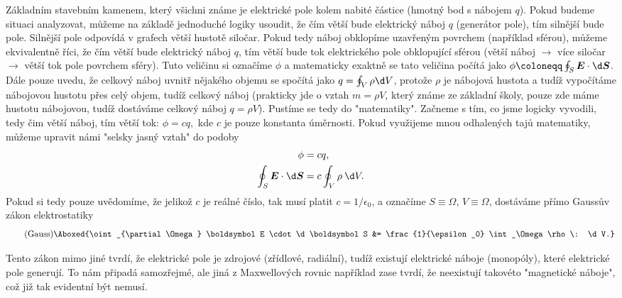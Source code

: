 \documentclass[11pt,a4paper]{report}
\renewcommand{\vec}{\boldsymbol}
\begin{document}
		Základním stavebním kamenem, který všichni známe je elektrické pole kolem nabité částice (hmotný bod s nábojem $q$). Pokud budeme situaci analyzovat, můžeme na základě jednoduché logiky usoudit, že čím větší bude elektrický náboj $q$ (generátor pole), tím silnější bude pole. Silnější pole odpovídá v grafech větší hustotě siločar. Pokud tedy náboj obklopíme uzavřeným povrchem (například sférou), můžeme ekvivalentně říci, že čím větší bude elektrický náboj $q$, tím větší bude tok elektrického pole obklopující sférou (větší náboj $\rightarrow$ více siločar $\rightarrow$ větší tok pole povrchem sféry). Tuto veličinu si označíme $\phi$ a matematicky exaktně se tato veličina počítá jako $\phi \coloneqq \oint_{S} \vec E \cdot \d \vec S$. Dále pouze uvedu, že celkový náboj uvnitř nějakého objemu se spočítá jako $q = \oint_V \rho \d V$, protože $\rho$ je nábojová hustota a tudíž vypočítáme nábojovou hustotu přes celý objem, tudíž celkový náboj (prakticky jde o vztah $m = \rho V$, který známe ze základní školy, pouze zde máme hustotu nábojovou, tudíž dostáváme celkový náboj $q=\rho V$). Pustíme se tedy do "matematiky". Začneme s tím, co jsme logicky vyvodili, tedy čim větší náboj, tím větší tok: $\phi = c q,$
		kde $c$ je pouze konstanta úměrnosti. Pokud využijeme mnou odhalených tajů matematiky, můžeme upravit námi "selsky jasný vztah" do podoby
		\begin{align*}
			\phi &= c q,
		\\
			\oint_{S} \vec E \cdot \d \vec S &= c \oint_V \rho \: \d V.
		\end{align*}
		Pokud si tedy pouze uvědomíme, že jelikož $c$ je reálné číslo, tak musí platit $c=1/\epsilon_0$, a označíme $S \equiv \Omega$, $V \equiv \Omega$, dostáváme přímo Gaussův zákon elektrostatiky
		\begin{align}
			\tag{Gauss}
			\Aboxed{\oint_{\partial \Omega} \vec E \cdot \d \vec S &= \frac{1}{\epsilon_0} \int_\Omega \rho \: \d V.}
		\end{align}
		
		Tento zákon mimo jiné tvrdí, že elektrické pole je zdrojové (zřídlové, radiální), tudíž existují elektrické náboje (monopóly), které elektrické pole generují. To nám připadá samozřejmé, ale jiná z Maxwellových rovnic například zase tvrdí, že neexistují takovéto "magnetické náboje", což již tak evidentní být nemusí.
		
		\newpage
		\begin{center}
		\end{center}
	
	
		
	
\end{document}
